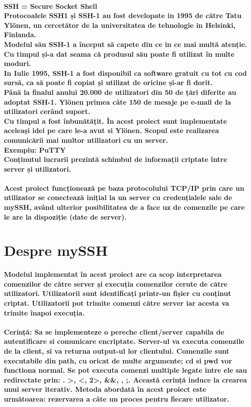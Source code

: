 \documentclass{article}
\begin{document}
	\paragraph {
		SSH = Secure Socket Shell\\
		Protocoalele SSH1 și SSH-1 au fost developate in 1995 de către Tatu Ylönen, un cercetător de la universitatea de tehnologie in Helsinki, Finlanda.\\
		Modelul său SSH-1 a început să capete din ce in ce mai multă atenție. Cu timpul și-a dat seama că produsul său poate fi utilizat în multe moduri.\\
		In Iulie 1995, SSH-1 a fost disponibil ca software gratuit cu tot cu cod sursă, ca să poate fi copiat și utilizat de oricine și-ar fi dorit.\\
		Până la finalul anului 20.000 de utilizatori din 50 de țări diferite au adoptat SSH-1. Ylönen primea câte 150 de mesaje pe e-mail de la utilizatori cerând suport.
		\\
		Cu timpul a fost înbunătățit. În acest proiect sunt implementate aceleași idei pe care le-a avut si Ylönen. 
		Scopul este realizarea comunicării mai multor utilizatori cu un server. \\
		Exemplu: PuTTY\\
		Conținutul lucrarii prezintă schimbul de informații criptate între server și utilizatori.
		}

	\paragraph{
		Acest proiect funcționează pe baza protocolului TCP/IP prin care un utilizator se conectează inițial la un server cu credențialele sale de mySSH, având ulterior posibilitatea de a face uz de comenzile pe care le are la dispoziție (date de server).
	}
	\section{Despre mySSH}
	\paragraph{
		Modelul implementat în acest proiect are ca scop interpretarea comenzilor de către server și execuția comenzilor cerute de către utilizatori. Utilizatorii sunt identificați printr-un fișier cu conținut criptat. Utilizatorii pot trimite comenzi către server iar acesta va trimite înapoi execuția.
	}
	\paragraph{
		Cerință: Sa se implementeze o pereche client/server capabila de autentificare si comunicare encriptate. Server-ul va executa comenzile de la client, si va returna output-ul lor clientului. Comenzile sunt executabile din path, cu oricat de multe argumente; cd si pwd vor functiona normal. Se pot executa comenzi multiple legate intre ele sau redirectate prin: \textbar. \textgreater, \textless, 2\textgreater, \&\&, \textbar\textbar, ;.
		\newline
		Această cerință induce la crearea unui server iterativ. Metoda abordată în acest proiect este următoarea: rezervarea a câte un proces pentru fiecare utilizator.
	}
	
\end{document}
